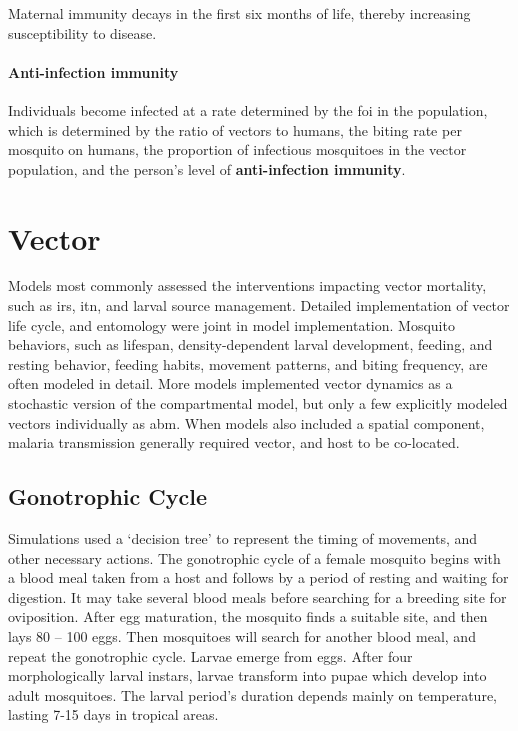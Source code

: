 \documentclass[a4paper, 12pt, twoside]{article}
\begin{document}
Maternal immunity decays in the first six months of life, thereby increasing susceptibility to disease.

\paragraph{Anti-infection immunity}
Individuals become infected at a rate determined by the \gls{foi} in the population, which is determined by the ratio of vectors to humans, the biting rate per mosquito on humans, the proportion of infectious mosquitoes in the vector population, and the person’s level of \textbf{anti-infection immunity}.



\section{Vector}%
\label{sec:vector}
Models most commonly assessed the interventions impacting vector mortality, such as \gls{irs}, \gls{itn}, and larval source management.
Detailed implementation of vector life cycle, and entomology were joint in model implementation.
Mosquito behaviors, such as lifespan, density-dependent larval development, feeding, and resting behavior, feeding habits, movement patterns, and biting frequency, are often modeled in detail.
More models implemented vector dynamics as a stochastic version of the compartmental model\cite{Sherrard-Smith2018b}, but only a few explicitly modeled vectors individually as \gls{abm}. 
When models also included a spatial component, malaria transmission generally required vector, and host to be co-located.

\subsection{Gonotrophic Cycle}
Simulations used a ‘decision tree’ to represent the timing of movements, and other necessary actions.
The gonotrophic cycle of a female mosquito begins with a blood meal taken from a host and follows by a period of resting and waiting for digestion.
It may take several blood meals before searching for a breeding site for oviposition.
After egg maturation, the mosquito finds a suitable site, and then lays 80 – 100 eggs.
Then mosquitoes will search for another blood meal, and repeat the gonotrophic cycle.
Larvae emerge from eggs.
After four morphologically larval instars, larvae transform into pupae which develop into adult mosquitoes.
The larval period's duration depends mainly on temperature, lasting 7-15 days in tropical areas.
\end{document}
